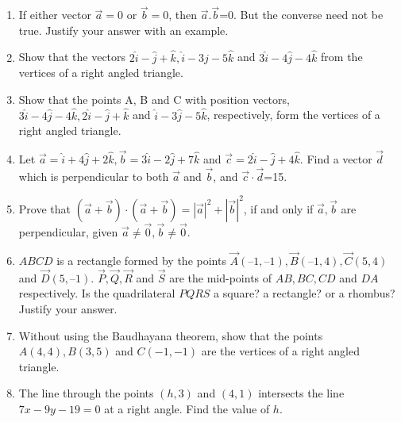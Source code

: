 \begin{enumerate}[label=\thesection.\arabic*,ref=\thesection.\theenumi]
	\\
	\solution
		
\item If either vector $\overrightarrow {a}=0$ or $\overrightarrow {b}=0$, then $\overrightarrow {a}.\overrightarrow {b}$=0. But the converse need not be true. Justify your answer with an example.
	\\
	\solution
		
\item Show that the vectors $2\hat{i}-\hat{j}+\hat{k},\hat{i}-3\hat{j}-5\hat{k}$ and  $3\hat{i}-4\hat{j}-4\hat{k}$ from the vertices of a right angled triangle.
	\\
	\solution
		
\item Show that the points A, B and C with position vectors, $3\hat{i}-4\hat{j}-4\hat{k}, 2\hat{i}-\hat{j}+\hat{k}$ and $\hat{i}-3\hat{j}-5\hat{k}$, respectively, form the vertices of a right angled
triangle.
\\
\solution
		
\item Let $\vec{a}=\hat{i}+4\hat{j}+2\hat{k}, \vec{b}=3\hat{i}-2\hat{j}+7\hat{k}$ and $\vec{c}=2\hat{i}-\hat{j}+4\hat{k}$. Find a vector $\vec{d}$ which is perpendicular to both $\vec{a}$ and $\vec{b}$, and $\vec{c}\cdot \vec{d}$=15.\\
	\solution
		
\item Prove that $(\vec{a}+\vec{b})\cdot(\vec{a}+\vec{b})=|{\vec{a}}|^2+|{\vec{b}}|^2$, if and only if $\vec{a}, \vec{b}$ are perpendicular, given $\vec{a}\neq\vec{0}, \vec{b}\neq\vec{0}$.\\
	\solution
		
\item $ABCD$ is a rectangle formed by the points $\vec{A}(–1, –1), \vec{B}(– 1, 4), \vec{C}(5, 4)$  and  $\vec{D}(5, – 1)$. $\vec{P}, \vec{Q}, \vec{R}$ and $\vec{S}$ are the mid-points of $AB, BC, CD$ and $DA$ respectively. Is the quadrilateral $PQRS$ a square? a rectangle? or a rhombus? Justify your answer.
	\\
	
\item Without using the Baudhayana theorem, show that the points $A(4,4), B(3,5)$ and $C(-1,-1)$ are the vertices of a right angled triangle.
\label{chapters/11/10/1/6}

\item The line through the points $(h, 3)$ and $(4, 1)$ intersects the line $7x- 9y- 19= 0$ at a right angle. Find the value of $h$.

\end{enumerate}
